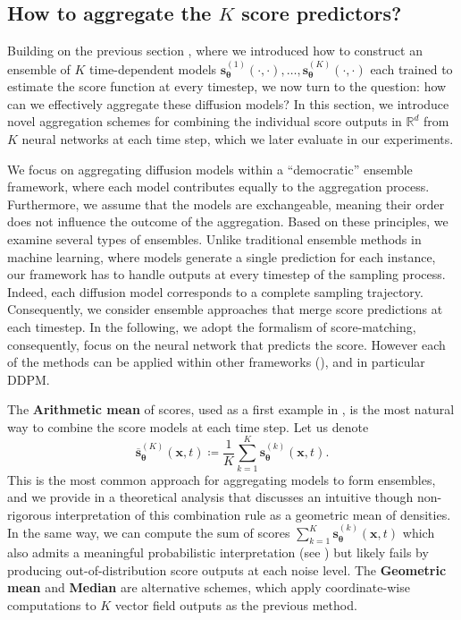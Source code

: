 \documentclass[10pt]{article} %
\newcommand{\engquote}[1]{``#1''}
\def\rvx{{\mathbf{x}}}
\def\vtheta{{\bm{\theta}}}
\def\vs{{\bm{s}}}
\begin{document}
\subsection{How to aggregate the $K$ score predictors?}\label{section: ensemble mechanisms}


Building on the previous section , where we introduced how to construct an ensemble of $K$ time-dependent models $\vs_{\vtheta}^{(1)}(\cdot,\cdot), \dots, \vs_{\vtheta}^{(K)}(\cdot,\cdot)$ each trained to estimate the score function at every timestep, we now turn to the question: how can we effectively aggregate these diffusion models? In this section, we introduce novel aggregation schemes for combining the individual score outputs in $\mathbb{R}^d$ from $K$ neural networks at each time step, which we later evaluate in our experiments.

We focus on aggregating diffusion models within a \engquote{democratic} ensemble framework, where each model contributes equally to the aggregation process. Furthermore, we assume that the models are exchangeable, meaning their order does not influence the outcome of the aggregation. Based on these principles, we examine several types of ensembles. Unlike traditional ensemble methods in machine learning, where models generate a single prediction for each instance, our framework has to handle outputs at every timestep of the sampling process. Indeed, each diffusion model corresponds to a complete sampling trajectory. Consequently, we consider ensemble approaches that merge score predictions at each timestep. In the following, we adopt the formalism of score-matching, consequently, focus on the neural network that predicts the score. However each of the methods can be applied within other frameworks (), and in particular DDPM. 



The \textbf{Arithmetic mean} of scores, used as a first example in , is the most natural way to combine the score models at each time step. Let us denote
\begin{equation}
\overline{\vs}^{(K)}_\vtheta(\rvx, t) \coloneqq \frac{1}{K}\sum_{k=1}^K \vs^{(k)}_\vtheta(\rvx, t).
\end{equation}
This is the most common approach for aggregating models to form ensembles, and we provide in  a theoretical analysis that discusses an intuitive though non-rigorous interpretation of this combination rule as a geometric mean of densities. In the same way, we can compute the sum of scores $\sum_{k=1}^K \vs_\vtheta^{(k)}(\rvx, t)$ which also admits a meaningful probabilistic interpretation (see ) but likely fails by producing out-of-distribution score outputs at each noise level.
The \textbf{Geometric mean} and \textbf{Median} are alternative schemes, which apply coordinate-wise computations to $K$ vector field outputs as the previous method.
\end{document}
